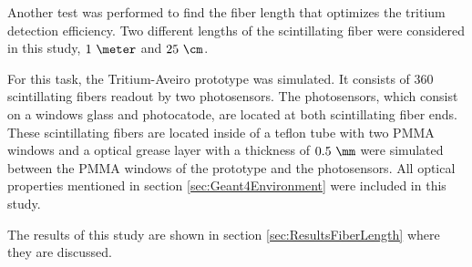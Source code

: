 Another test was performed to find the fiber length that optimizes the tritium detection efficiency. Two different lengths of the scintillating fiber were considered in this study, $1~\meter$ and $25~\cm$. 

For this task, the Tritium-Aveiro prototype was simulated. It consists of $360$ scintillating fibers readout by two photosensors. The photosensors, which consist on a windows glass and photocatode, are located at both scintillating fiber ends. These scintillating fibers are located inside of a teflon tube with two PMMA windows and a optical grease layer with a thickness of $0.5~\mm$ were simulated between the PMMA windows of the prototype and the photosensors. All optical properties mentioned in section \ref{sec:Geant4Environment} were included in this study.

The results of this study are shown in section \ref{sec:ResultsFiberLength} where they are discussed.